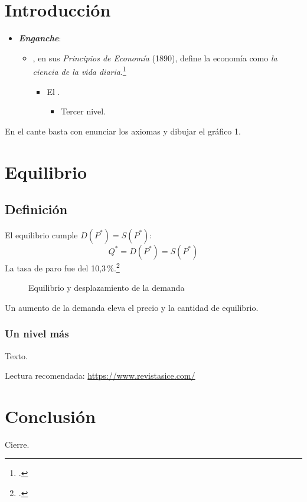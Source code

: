 \documentclass[11pt]{article}
\begin{document}
\tceetitulo
\section*{Introducción}
\begin{itemize}
\item \textbf{\emph{Enganche}}:
  \begin{itemize}
  \item {}, en sus \emph{Principios de Economía} (1890), define la economía como \emph{la ciencia de la vida diaria}.\footcite[cap.~3]{MasColell1995}
    \begin{itemize}
    \item El  .
      \begin{itemize}\item Tercer nivel.\end{itemize}
    \end{itemize}
  \end{itemize}
\end{itemize}
\begin{notaopositor}
En el cante basta con enunciar los axiomas y dibujar el gráfico 1.
\end{notaopositor}
\section{Equilibrio}
\subsection{Definición}
El equilibrio cumple $D(P^*)=S(P^*)$:
\begin{equation}
  Q^* = D(P^*) = S(P^*) \label{eq:equilibrio}
\end{equation}
La tasa de paro fue del 10,3\,\%.\footcite{INE2026EPA}
\begin{figure}[H]
\centering
\caption{Equilibrio y desplazamiento de la demanda}\label{fig:equilibrio}
\end{figure}
\begin{ideaclave}
Un aumento de la demanda eleva el precio y la cantidad de equilibrio.
\end{ideaclave}
\subsubsection{Un nivel más}
Texto.
\begin{anotaciones}
Lectura recomendada: \url{https://www.revistasice.com/}
\end{anotaciones}
\section*{Conclusión}
Cierre.
\bibliografia
\end{document}

